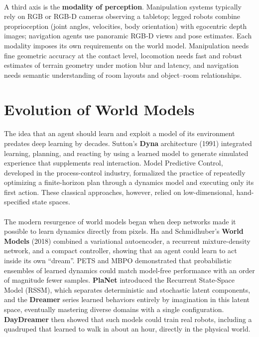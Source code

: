 \documentclass[12pt,a4paper,final]{extreport}
\begin{document}
\paragraph{} A third axis is the \textbf{modality of perception}. Manipulation systems typically rely on RGB or RGB-D cameras observing a tabletop; legged robots combine proprioception (joint angles, velocities, body orientation) with egocentric depth images; navigation agents use panoramic RGB-D views and pose estimates. Each modality imposes its own requirements on the world model. Manipulation needs fine geometric accuracy at the contact level, locomotion needs fast and robust estimates of terrain geometry under motion blur and latency, and navigation needs semantic understanding of room layouts and object--room relationships.

\section{Evolution of World Models}

\paragraph{} The idea that an agent should learn and exploit a model of its environment predates deep learning by decades. Sutton's \textbf{Dyna} architecture \cite{sutton1991} (1991) integrated learning, planning, and reacting by using a learned model to generate simulated experience that supplements real interaction. Model Predictive Control, developed in the process-control industry, formalized the practice of repeatedly optimizing a finite-horizon plan through a dynamics model and executing only its first action. These classical approaches, however, relied on low-dimensional, hand-specified state spaces.

\paragraph{} The modern resurgence of world models began when deep networks made it possible to learn dynamics directly from pixels. Ha and Schmidhuber's \textbf{World Models} (2018) combined a variational autoencoder, a recurrent mixture-density network, and a compact controller, showing that an agent could learn to act inside its own ``dream''. PETS and MBPO demonstrated that probabilistic ensembles of learned dynamics could match model-free performance with an order of magnitude fewer samples. \textbf{PlaNet} \cite{hafner2019planet} introduced the Recurrent State-Space Model (RSSM), which separates deterministic and stochastic latent components, and the \textbf{Dreamer} series \cite{hafner2023dreamerv3} learned behaviors entirely by imagination in this latent space, eventually mastering diverse domains with a single configuration. \textbf{DayDreamer} then showed that such models could train real robots, including a quadruped that learned to walk in about an hour, directly in the physical world.
\end{document}
